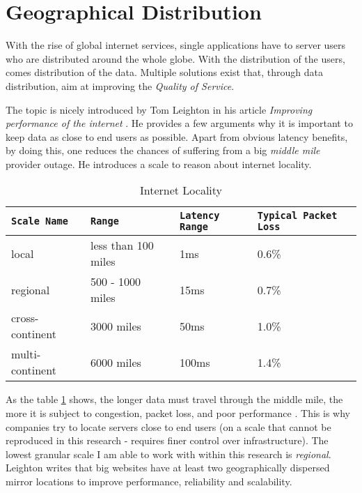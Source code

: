 \documentclass{uvamscse}
\begin{document}
\section{Geographical Distribution}

With the rise of global internet services, single applications have to server users who are distributed around the whole globe. With the distribution of the users, comes distribution of the data. Multiple solutions exist that, through data distribution, aim at improving the \textit{Quality of Service}.

The topic is nicely introduced by Tom Leighton in his article \textit{Improving performance of the internet} \cite{Akamai}. He provides a few arguments why it is important to keep data as close to end users as possible. Apart from obvious latency benefits, by doing this, one reduces the chances of suffering from a big \textit{middle mile} provider outage.
He introduces a scale to reason about internet locality.

\begin{table}[h]
\begin{center}
\begin{tabular}{llll}
  \texttt{Scale Name}       & \texttt{Range}        & \texttt{Latency Range}  & \texttt{Typical Packet Loss}\\
  \hline
  local                     & less than 100 miles   & 1ms                     & 0.6\% \\
  regional                  & 500 - 1000 miles      & 15ms                    & 0.7\% \\
  cross-continent           & 3000 miles            & 50ms                    & 1.0\% \\
  multi-continent           & 6000 miles            & 100ms                   & 1.4\% \\
\end{tabular}
\end{center}
\caption{Internet Locality}
\label{table:internetLocality}
\end{table}
As the table \ref{table:internetLocality} shows, the longer data must travel through the middle mile, the more it is subject to congestion, packet loss, and poor performance \cite{Akamai}. This is why companies try to locate servers close to end users (on a scale that cannot be reproduced in this research - requires finer control over infrastructure). The lowest granular scale I am able to work with within this research is \textit{regional}. Leighton writes that big websites have at least two geographically dispersed mirror locations to improve performance, reliability and scalability.
\end{document}
